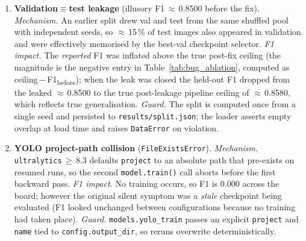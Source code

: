 \documentclass[conference]{IEEEtran}
\begin{document}
\begin{enumerate}
\item \textbf{Validation$\equiv$test leakage}
  (illusory F1\,$\approx$\,0.8500 before the fix).
  \textit{Mechanism.} An earlier split drew val and test from the same
  shuffled pool with independent seeds, so $\approx$\,15\,\% of test
  images also appeared in validation and were effectively memorised
  by the best-val checkpoint selector.  \textit{F1 impact.} The
  \emph{reported} F1 was inflated above the true post-fix ceiling
  (the magnitude is the negative entry in
  Table~\ref{tab:bug_ablation}, computed as
  ceiling\,$-$\,F1\textsubscript{before}); when the leak was closed
  the held-out F1 dropped from the leaked
  $\approx$\,0.8500 to the true post-leakage
  pipeline ceiling of $\approx$\,0.8580, which reflects
  true generalisation.  \textit{Guard.} The split is
  computed once from a single seed and persisted to
  \texttt{results/split.json}; the loader asserts empty overlap at
  load time and raises \texttt{DataError} on violation.

\item \textbf{YOLO project-path collision} (\texttt{FileExistsError}).
  \textit{Mechanism.} \texttt{ultralytics}\,$\geq$\,8.3 defaults
  \texttt{project} to an absolute path that pre-exists on resumed
  runs, so the second \texttt{model.train()} call aborts before the
  first backward pass.  \textit{F1 impact.} No training occurs, so
  F1 is 0.000 across the board; however the original silent symptom
  was a \emph{stale} checkpoint being evaluated (F1 looked
  unchanged between configurations because no training had taken
  place).  \textit{Guard.} \texttt{models.yolo\_train} passes an
  explicit \texttt{project} and \texttt{name} tied to
  \texttt{config.output\_dir}, so reruns overwrite deterministically.


\end{enumerate}
\end{document}
